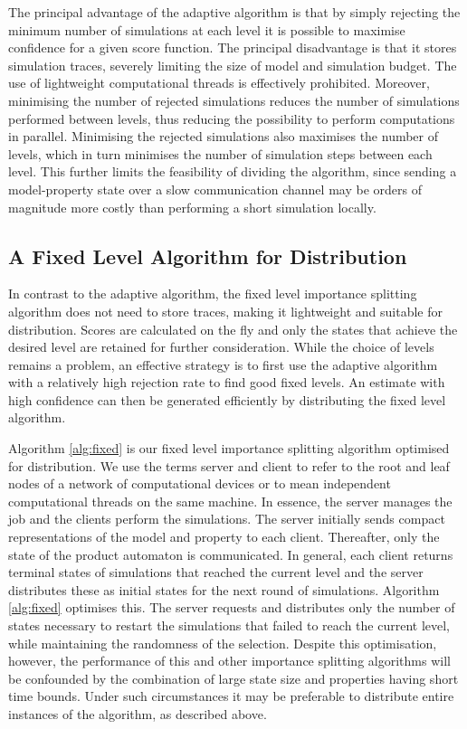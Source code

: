 \documentclass{llncs}
\begin{document}
The principal advantage of the adaptive algorithm is that by simply
rejecting the minimum number of simulations at each level it is possible
to maximise confidence for a given score function. The principal disadvantage
is that it stores simulation traces, severely limiting the size of
model and simulation budget. The use of lightweight computational
threads is effectively prohibited. Moreover, minimising the number
of rejected simulations reduces the number of simulations performed
between levels, thus reducing the possibility to perform computations
in parallel. Minimising the rejected simulations also maximises the
number of levels, which in turn minimises the number of simulation
steps between each level. This further limits the feasibility of dividing
the algorithm, since sending a model-property state over a slow communication
channel may be orders of magnitude more costly than performing a short
simulation locally.


\subsection{A Fixed Level Algorithm for Distribution\label{sec:fixed}}

In contrast to the adaptive algorithm, the fixed level importance
splitting algorithm does not need to store traces, making it lightweight
and suitable for distribution. Scores are calculated on the fly and
only the states that achieve the desired level are retained for further
consideration. While the choice of levels remains a problem, an effective
strategy is to first use the adaptive algorithm with a relatively
high rejection rate to find good fixed levels. An estimate with high
confidence can then be generated efficiently by distributing the fixed
level algorithm.

Algorithm \ref{alg:fixed} is our fixed level importance splitting
algorithm optimised for distribution. We use the terms server and
client to refer to the root and leaf nodes of a network of computational
devices or to mean independent computational threads on the same machine.
In essence, the server manages the job and the clients perform the
simulations. The server initially sends compact representations of
the model and property to each client. Thereafter, only the state
of the product automaton is communicated. In general, each client
returns terminal states of simulations that reached the current level
and the server distributes these as initial states for the next round
of simulations. Algorithm \ref{alg:fixed} optimises this. The server
requests and distributes only the number of states necessary to restart
the simulations that failed to reach the current level, while maintaining
the randomness of the selection. Despite this optimisation, however,
the performance of this and other importance splitting algorithms
will be confounded by the combination of large state size and properties
having short time bounds. Under such circumstances it may be preferable
to distribute entire instances of the algorithm, as described above. 
\end{document}
